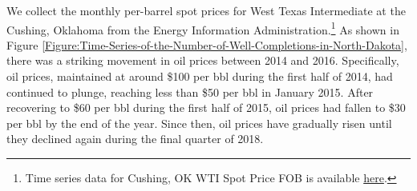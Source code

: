 We collect the monthly per-barrel spot prices for West Texas Intermediate at the Cushing, Oklahoma from the Energy Information Administration.\footnote{Time series data for Cushing, OK WTI Spot Price FOB is available \href{https://www.eia.gov/dnav/pet/PET\_PRI\_SPT\_S1\_M.htm}{here}.} As shown in Figure \ref{Figure:Time-Series-of-the-Number-of-Well-Completions-in-North-Dakota}, there was a striking movement in oil prices between 2014 and 2016. Specifically, oil prices, maintained at around \$100 per bbl during the first half of 2014, had continued to plunge, reaching less than \$50 per bbl in January 2015. After recovering to \$60 per bbl during the first half of 2015, oil prices had fallen to \$30 per bbl by the end of the year. Since then, oil prices have gradually risen until they declined again during the final quarter of 2018.
